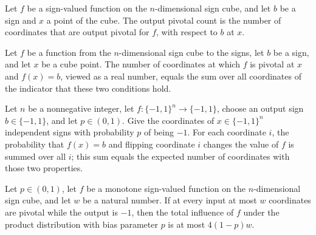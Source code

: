 \begin{definition}
\label{FABL.outputPivotalCount}
\leanok
{}
Let $f$ be a sign-valued function on the $n$-dimensional sign cube, and let $b$ be a
sign and $x$ a point of the cube. The output pivotal count is the number of coordinates
that are output pivotal for $f$, with respect to $b$ at $x$.
\end{definition}

\begin{theorem}
\label{FABL.outputPivotalCount_cast}
\leanok
{}
Let $f$ be a function from the $n$-dimensional sign cube to the signs, let $b$ be a
sign, and let $x$ be a cube point. The number of coordinates at which $f$ is pivotal at
$x$ and $f(x)=b$, viewed as a real number, equals the sum over all coordinates of the
indicator that these two conditions hold.
\end{theorem}

\begin{theorem}
\label{FABL.sum_biasedOutputPivotalProbability}
\leanok
{}
Let $n$ be a nonnegative integer, let $f:\{-1,1\}^n\to\{-1,1\}$, choose an output sign
$b\in\{-1,1\}$, and let $p\in(0,1)$. Give the coordinates of $x\in\{-1,1\}^n$
independent signs with probability $p$ of being $-1$. For each coordinate $i$, the
probability that $f(x)=b$ and flipping coordinate $i$ changes the value of $f$ is summed
over all $i$; this sum equals the expected number of coordinates with those two
properties.
\end{theorem}

\begin{theorem}
\label{FABL.productTotalInfluence_le_four_mul_complement_mul_of_negOnePivotalCount_le}
\leanok
{}
Let $p\in(0,1)$, let $f$ be a monotone sign-valued function on the $n$-dimensional sign
cube, and let $w$ be a natural number. If at every input at most $w$ coordinates are
pivotal while the output is $-1$, then the total influence of $f$ under the product
distribution with bias parameter $p$ is at most $4(1-p)w$.
\end{theorem}

